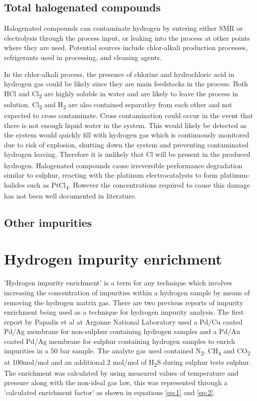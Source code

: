 \subsection*{Total halogenated compounds} 
Halogenated compounds can contaminate hydrogen by entering either SMR or electrolysis through the process input, or leaking into the process at other points where they are used. Potential sources include chlor-alkali production processes, refrigerants used in processing, and cleaning agents. \cite{Bacquart2018}

In the chlor-alkali process, the presence of chlorine and hydrochloric acid in hydrogen gas could be likely since they are main feedstocks in the process. Both HCl and Cl\textsubscript{2} are highly soluble in water and are likely to leave the process in solution. Cl\textsubscript{2} and H\textsubscript{2} are also contained separatley from each other and not expected to cross contaminate. Cross contamination could occur in the event that there is not enough liquid water in the system. This would likely be detected as the system would quickly fill with hydrogen gas which is continuously monitored due to risk of explosion, shutting down the system and preventing contaminated hydrogen leaving. Therefore it is unlikely that Cl\textsubscript{ } will be present in the produced hydrogen. 
Halogenated compounds cause irreversible performance degradation similar to sulphur, reacting with the platinum electrocatalysts to form platinum-halides such as PtCl\textsubscript{4}. \cite{Dona2009} However the concentrations required to cause this damage has not been well documented in literature.

\subsection*{Other impurities}

\section{Hydrogen impurity enrichment}
'Hydrogen impurity enrichment' is a term for any technique which involves increasing the concentration of impurities within a hydrogen sample by means of removing the hydrogen matrix gas. There are two previous reports of impurity enrichment being used as a technique for hydrogen impurity 
analysis. The first report by Papadis et al at Argonne National Laboratory used a Pd/Cu \cite{Ahmed2010} coated Pd/Ag membrane for non-sulphur containing hydrogen samples and a Pd/Au coated Pd/Ag membrane for sulphur 
containing hydrogen samples to enrich impurities in a 50 bar sample. The analyte gas used contained N\textsubscript{2}, CH\textsubscript{4} and CO\textsubscript{2} at 100\textmu mol/mol and an additional 
 2 \textmu mol/mol of H\textsubscript{2}S during sulphur tests sulphur. 
The enrichment was calculated by using measured values of temperature and pressure along with the non-ideal gas law, this was represented through a 'calculated enrichment factor' as shown in equations \ref{eq:1}
and \ref{eq:2}. 

